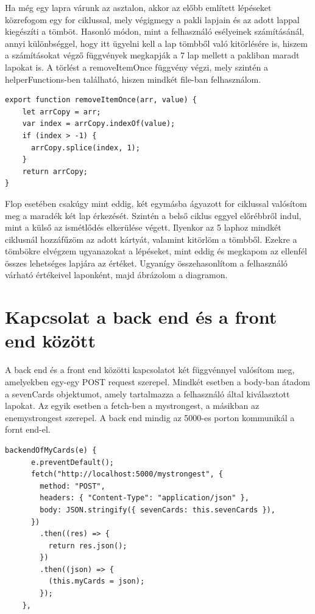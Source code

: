 Ha még egy lapra várunk az asztalon, akkor az előbb említett lépéseket közrefogom egy for ciklussal, mely végigmegy a pakli lapjain és az adott lappal kiegészíti a tömböt. Hasonló módon, mint a felhasználó esélyeinek számításánál, annyi különbséggel, hogy itt ügyelni kell a lap tömbből való kitörlésére is, hiszem a számításokat végző függvények megkapják a 7 lap mellett a pakliban maradt lapokat is. A törlést a removeItemOnce függvény végzi, mely szintén a helperFunctions-ben található, hiszen mindkét file-ban felhasználom.

\begin{lstlisting}[style=htmlcssjs]
export function removeItemOnce(arr, value) {
    let arrCopy = arr;
    var index = arrCopy.indexOf(value);
    if (index > -1) {
      arrCopy.splice(index, 1);
    }
    return arrCopy;
}
\end{lstlisting}

Flop esetében csakúgy mint eddig, két egymásba ágyazott for ciklussal valósítom meg a maradék két lap érkezését. Szintén a belső ciklus eggyel előrébbről indul, mint a külső az ismétlődés elkerülése végett. Ilyenkor az 5 laphoz mindkét ciklusnál hozzáfűzöm az adott kártyát, valamint kitörlöm a tömbből. Ezekre a tömbökre elvégzem ugyanazokat a lépéseket, mint eddig és megkapom az ellenfél összes lehetséges lapjára az értéket. Ugyanígy összehasonlítom a felhasználó várható értékeivel laponként, majd ábrázolom a diagramon.

\section{Kapcsolat a back end és a front end között}
A back end és a front end közötti kapcsolatot két függvénnyel valósítom meg, amelyekben egy-egy POST request szerepel. Mindkét esetben a body-ban átadom a sevenCards objektumot, amely tartalmazza a felhasználó által kiválasztott lapokat. Az egyik esetben a fetch-ben a mystrongest, a másikban az enemystrongest szerepel. A back end mindig az 5000-es porton kommunikál a fornt end-el.

\begin{lstlisting}[style=htmlcssjs]
backendOfMyCards(e) {
      e.preventDefault();
      fetch("http://localhost:5000/mystrongest", {
        method: "POST",
        headers: { "Content-Type": "application/json" },
        body: JSON.stringify({ sevenCards: this.sevenCards }),
      })
        .then((res) => {
          return res.json();
        })
        .then((json) => {
          (this.myCards = json);
        });
    },
\end{lstlisting}

